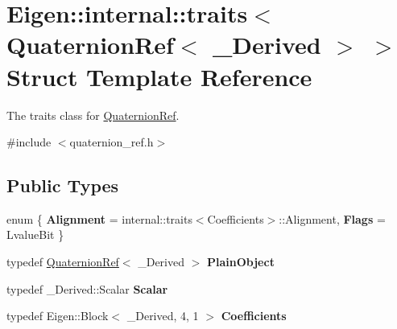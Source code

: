 \hypertarget{structEigen_1_1internal_1_1traits_3_01QuaternionRef_3_01__Derived_01_4_01_4}{}\section{Eigen\+:\+:internal\+:\+:traits$<$ Quaternion\+Ref$<$ \+\_\+\+Derived $>$ $>$ Struct Template Reference}
\label{structEigen_1_1internal_1_1traits_3_01QuaternionRef_3_01__Derived_01_4_01_4}


The traits class for \hyperlink{classEigen_1_1QuaternionRef}{Quaternion\+Ref}.  




{\ttfamily \#include $<$quaternion\+\_\+ref.\+h$>$}

\subsection*{Public Types}
\begin{DoxyCompactItemize}
\item 
enum \{ {\bfseries Alignment} = internal\+:\+:traits$<$Coefficients$>$\+:\+:Alignment, 
{\bfseries Flags} = Lvalue\+Bit
 \}\hypertarget{structEigen_1_1internal_1_1traits_3_01QuaternionRef_3_01__Derived_01_4_01_4_acd608453e0cd4940f6f49964daa8e84e}{}\label{structEigen_1_1internal_1_1traits_3_01QuaternionRef_3_01__Derived_01_4_01_4_acd608453e0cd4940f6f49964daa8e84e}

\item 
typedef \hyperlink{classEigen_1_1QuaternionRef}{Quaternion\+Ref}$<$ \+\_\+\+Derived $>$ {\bfseries Plain\+Object}\hypertarget{structEigen_1_1internal_1_1traits_3_01QuaternionRef_3_01__Derived_01_4_01_4_afb4148e5066544aadd54ebee6c0a6f5d}{}\label{structEigen_1_1internal_1_1traits_3_01QuaternionRef_3_01__Derived_01_4_01_4_afb4148e5066544aadd54ebee6c0a6f5d}

\item 
typedef \+\_\+\+Derived\+::\+Scalar {\bfseries Scalar}\hypertarget{structEigen_1_1internal_1_1traits_3_01QuaternionRef_3_01__Derived_01_4_01_4_a24e9f1afdf166a5dd1f61db147199699}{}\label{structEigen_1_1internal_1_1traits_3_01QuaternionRef_3_01__Derived_01_4_01_4_a24e9f1afdf166a5dd1f61db147199699}

\item 
typedef Eigen\+::\+Block$<$ \+\_\+\+Derived, 4, 1 $>$ {\bfseries Coefficients}\hypertarget{structEigen_1_1internal_1_1traits_3_01QuaternionRef_3_01__Derived_01_4_01_4_a2eb1c923a6451a17be2966e89306eae3}{}\label{structEigen_1_1internal_1_1traits_3_01QuaternionRef_3_01__Derived_01_4_01_4_a2eb1c923a6451a17be2966e89306eae3}

\end{DoxyCompactItemize}


